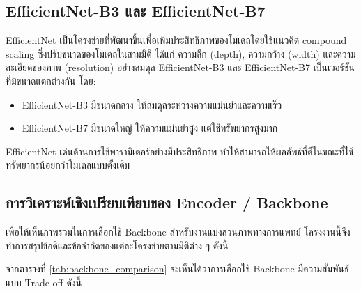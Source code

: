 \subsection{EfficientNet-B3 และ EfficientNet-B7}
EfficientNet เป็นโครงข่ายที่พัฒนาขึ้นเพื่อเพิ่มประสิทธิภาพของโมเดลโดยใช้แนวคิด compound scaling ซึ่งปรับขนาดของโมเดลในสามมิติ ได้แก่ ความลึก (depth), ความกว้าง (width) และความละเอียดของภาพ (resolution) อย่างสมดุล \cite{tan2019efficientnet}
EfficientNet-B3 และ EfficientNet-B7 เป็นเวอร์ชันที่มีขนาดแตกต่างกัน โดย:
\begin{itemize}
  \item EfficientNet-B3 มีขนาดกลาง ให้สมดุลระหว่างความแม่นยำและความเร็ว
  \item EfficientNet-B7 มีขนาดใหญ่ ให้ความแม่นยำสูง แต่ใช้ทรัพยากรสูงมาก
\end{itemize}
EfficientNet เด่นด้านการใช้พารามิเตอร์อย่างมีประสิทธิภาพ ทำให้สามารถให้ผลลัพธ์ที่ดีในขณะที่ใช้ทรัพยากรน้อยกว่าโมเดลแบบดั้งเดิม


\subsection{การวิเคราะห์เชิงเปรียบเทียบของ Encoder / Backbone}
เพื่อให้เห็นภาพรวมในการเลือกใช้ Backbone สำหรับงานแบ่งส่วนภาพทางการแพทย์ โครงงานนี้จึงทำการสรุปข้อดีและข้อจำกัดของแต่ละโครงข่ายตามมิติต่าง ๆ ดังนี้
\begin{table}[hbt!]
\centering
\caption{การเปรียบเทียบคุณลักษณะของ Backbone แต่ละประเภท}
\label{tab:backbone_comparison}
\end{table}

จากตารางที่ \ref{tab:backbone_comparison} จะเห็นได้ว่าการเลือกใช้ Backbone มีความสัมพันธ์แบบ Trade-off ดังนี้


